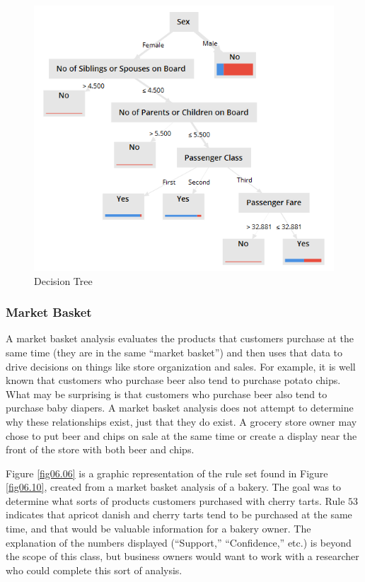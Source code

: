 \begin{figure}[H]
	\centering
	\includegraphics[width=\maxwidth{.95\linewidth}]{gfx/06-DecisionTree}
	\caption{Decision Tree}
	\label{fig06.05}
\end{figure}

\subsubsection{Market Basket}

A market basket analysis evaluates the products that customers purchase at the same time (they are in the same ``market basket'') and then uses that data to drive decisions on things like store organization and sales. For example, it is well known that customers who purchase beer also tend to purchase potato chips. What may be surprising is that customers who purchase beer also tend to purchase baby diapers. A market basket analysis does not attempt to determine why these relationships exist, just that they do exist. A grocery store owner may chose to put beer and chips on sale at the same time or create a display near the front of the store with both beer and chips. 

Figure \ref{fig06.06} is a graphic representation of the rule set found in Figure \ref{fig06.10}, created from a market basket analysis of a bakery. The goal was to determine what sorts of products customers purchased with cherry tarts. Rule $ 53 $ indicates that apricot danish and cherry tarts tend to be purchased at the same time, and that would be valuable information for a bakery owner. The explanation of the numbers displayed (``Support,'' ``Confidence,'' etc.) is beyond the scope of this class, but business owners would want to work with a researcher who could complete this sort of analysis.

